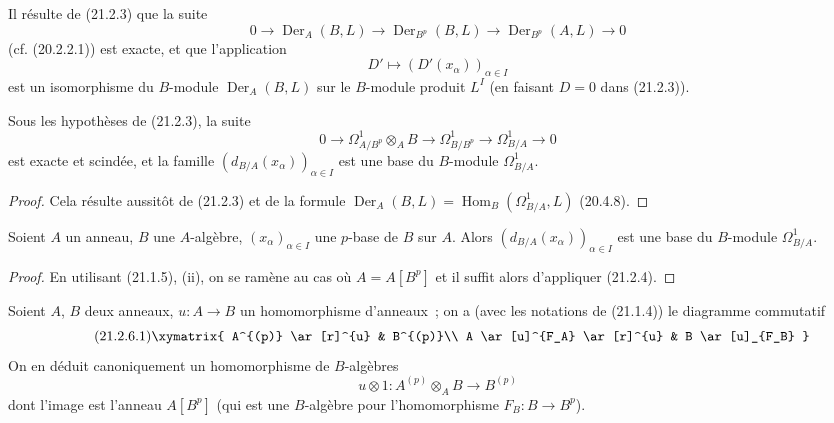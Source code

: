 Il résulte de (21.2.3) que la suite
\begin{equation}
\tag{21.2.3.1}
\label{0.21.2.3.1-fr}
0\to\operatorname{Der}_A(B,L)\to\operatorname{Der}_{B^p}(B,L)
\to\operatorname{Der}_{B^p}(A,L)\to0
\end{equation}
(cf. (20.2.2.1)) est exacte, et que l'application
\begin{equation}
\tag{21.2.3.2}
\label{0.21.2.3.2-fr}
D'\longmapsto(D'(x_\alpha))_{\alpha\in I}
\end{equation}
est un isomorphisme du $B$-module $\operatorname{Der}_A(B,L)$ sur le
$B$-module produit $L^I$ (en faisant $D=0$ dans (21.2.3)).

\begin{corollary}[21.2.4]
\label{0.21.2.4-fr}
Sous les hypothèses de (21.2.3), la suite
\begin{equation}
\tag{21.2.4.1}
\label{0.21.2.4.1-fr}
0\to\Omega^1_{A/B^p}\otimes_A B\to\Omega^1_{B/B^p}
\to\Omega^1_{B/A}\to0
\end{equation}
est exacte et scindée, et la famille $(d_{B/A}(x_\alpha))_{\alpha\in I}$ est
une base du $B$-module $\Omega^1_{B/A}$.
\end{corollary}

\begin{proof}
Cela résulte aussitôt de (21.2.3) et de la formule
$\operatorname{Der}_A(B,L)=\operatorname{Hom}_B(\Omega^1_{B/A},L)$ (20.4.8).
\end{proof}

\begin{corollary}[21.2.5]
\label{0.21.2.5-fr}
Soient $A$ un anneau, $B$ une $A$-algèbre, $(x_\alpha)_{\alpha\in I}$ une
$p$-base de $B$ sur $A$. Alors $(d_{B/A}(x_\alpha))_{\alpha\in I}$ est une
base du $B$-module $\Omega^1_{B/A}$.
\end{corollary}

\begin{proof}
En utilisant (21.1.5), (ii), on se ramène au cas où $A=A[B^p]$ et il suffit
alors d'appliquer (21.2.4).
\end{proof}

\begin{env}[21.2.6]
\label{0.21.2.6-fr}
Soient $A$, $B$ deux anneaux, $u:A\to B$ un homomorphisme d'anneaux~; on a
(avec les notations de (21.1.4)) le diagramme commutatif
\begin{equation}
\tag{21.2.6.1}
\label{0.21.2.6.1-fr}
\xymatrix{
 A^{(p)} \ar[r]^{u} & B^{(p)}\\
 A \ar[u]^{F_A} \ar[r]^{u} & B \ar[u]_{F_B}
}
\end{equation}
On en déduit canoniquement un homomorphisme de $B$-algèbres
\begin{equation}
\tag{21.2.6.2}
\label{0.21.2.6.2-fr}
u\otimes1:A^{(p)}\otimes_A B\longrightarrow B^{(p)}
\end{equation}
dont l'image est l'anneau $A[B^p]$ (qui est une $B$-algèbre pour
l'homomorphisme $F_B:B\to B^p$).
\end{env}

